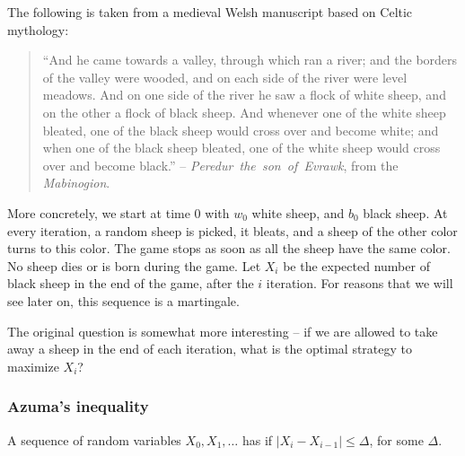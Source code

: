 \begin{example}
    The following is taken from a medieval Welsh manuscript based on
    Celtic mythology:
    \begin{quote}
        ``And he came towards a valley, through which ran a river; and
        the borders of the valley were wooded, and on each side of the
        river were level meadows. And on one side of the river he saw
        a flock of white sheep, and on the other a flock of black
        sheep. And whenever one of the white sheep bleated, one of the
        black sheep would cross over and become white; and when one of
        the black sheep bleated, one of the white sheep would cross
        over and become black.''  -- \emph{\si{Peredur the son of
              Evrawk}}, from the \emph{\si{Mabinogion}}.
    \end{quote}

    More concretely, we start at time $0$ with $w_0$ white sheep, and
    $b_0$ black sheep. At every iteration, a random sheep is picked,
    it bleats, and a sheep of the other color turns to this color. The
    game stops as soon as all the sheep have the same color. No sheep
    dies or is born during the game.  Let $X_i$ be the expected
    number of black sheep in the end of the game, after the $i$\th
    iteration. For reasons that we will see later on, this
    sequence is a martingale.

    The original question is somewhat more interesting -- if we are
    allowed to take away a sheep in the end of each iteration, what is
    the optimal strategy to maximize $X_i$?
\end{example}

\subsubsection{Azuma's inequality}
\mbox{}\par
A sequence of random variables $X_0, X_1, \ldots$ has
if $|X_i - X_{i-1}| \leq \Delta$, for some $\Delta$.

